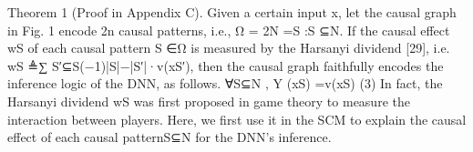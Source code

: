 Theorem 1 (Proof in Appendix C). Given a certain input
x, let the causal graph in Fig. 1 encode 2n causal patterns,
i.e., Ω = 2N ={S :S ⊆N}. If the causal effect wS of
each causal pattern S ∈Ω is measured by the Harsanyi
dividend [29], i.e. wS ≜∑
S′⊆S(−1)|S|−|S′|·v(xS′), then
the causal graph faithfully encodes the inference logic of the
DNN, as follows.
∀S⊆N , Y (xS) =v(xS) (3)
In fact, the Harsanyi dividend wS was ﬁrst proposed in
game theory to measure the interaction between players.
Here, we ﬁrst use it in the SCM to explain the causal effect
of each causal patternS⊆N for the DNN’s inference.
